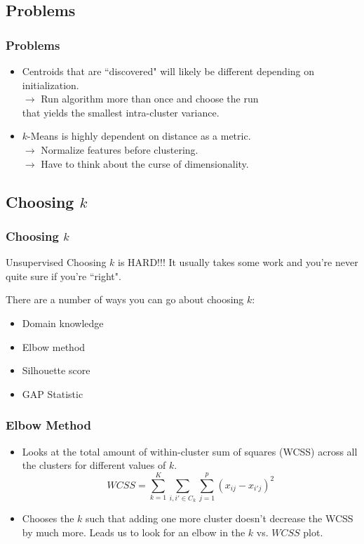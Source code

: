 \documentclass{beamer}
\begin{document}
\subsection{Problems}
\begin{frame}
  \frametitle{Problems}
  \begin{itemize}
    \item Centroids that are ``discovered" will likely be different depending on initialization. \pause \\
      \qquad $\longrightarrow$ Run algorithm more than once and choose the run \\
      \qquad \qquad that yields the smallest intra-cluster variance. \vspace{2mm} \pause
    \item $k$-Means is highly dependent on distance as a metric. \pause \\
      \qquad $\longrightarrow$ Normalize features before clustering. \pause \\
      \qquad $\longrightarrow$ Have to think about the curse of dimensionality.
  \end{itemize}
\end{frame}

\subsection{Choosing $k$}
\begin{frame}
  \frametitle{Choosing $k$}
  \begin{alertblock}{Unsupervised}
    Choosing $k$ is HARD!!! It usually takes some work and you're never quite sure if you're ``right".
  \end{alertblock} \vspace{4mm} \pause
  There are a number of ways you can go about choosing $k$:
  \begin{itemize}
    \item Domain knowledge
    \item Elbow method
    \item Silhouette score
    \item GAP Statistic
  \end{itemize}
\end{frame}

\begin{frame}
  \frametitle{Elbow Method}
  \begin{itemize}
    \item Looks at the total amount of within-cluster sum of squares (WCSS) across all the clusters for different values of $k$.
    $$ WCSS = \sum_{k=1}^K \sum_{i,i'\in C_k} \sum_{j=1}^p (x_{ij}-x_{i'j})^2 $$ \pause
    \item Chooses the $k$ such that adding one more cluster doesn't decrease the WCSS by much more. Leads us to look for an elbow in the $k$ vs. $WCSS$ plot.
  \end{itemize}
\end{frame}
\end{document}
